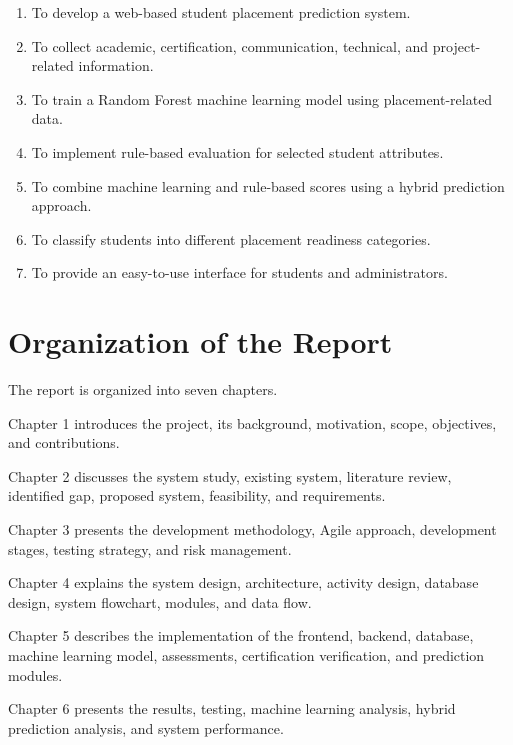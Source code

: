 \documentclass[12pt,a4paper]{report}
\begin{document}
\begin{enumerate}
    \item To develop a web-based student placement prediction
    system.

    \item To collect academic, certification, communication,
    technical, and project-related information.

    \item To train a Random Forest machine learning model using
    placement-related data.

    \item To implement rule-based evaluation for selected
    student attributes.

    \item To combine machine learning and rule-based scores
    using a hybrid prediction approach.

    \item To classify students into different placement readiness
    categories.

    \item To provide an easy-to-use interface for students and
    administrators.
\end{enumerate}


\section{Organization of the Report}

The report is organized into seven chapters.

Chapter 1 introduces the project, its background, motivation,
scope, objectives, and contributions.

Chapter 2 discusses the system study, existing system, literature
review, identified gap, proposed system, feasibility, and
requirements.

Chapter 3 presents the development methodology, Agile approach,
development stages, testing strategy, and risk management.

Chapter 4 explains the system design, architecture, activity
design, database design, system flowchart, modules, and data flow.

Chapter 5 describes the implementation of the frontend, backend,
database, machine learning model, assessments, certification
verification, and prediction modules.

Chapter 6 presents the results, testing, machine learning
analysis, hybrid prediction analysis, and system performance.
\end{document}
